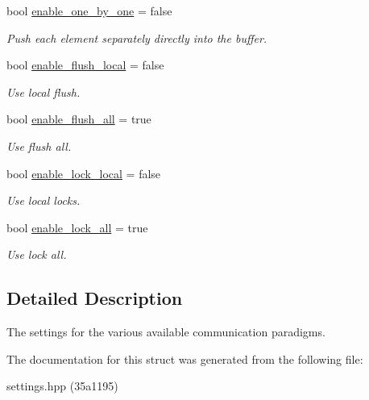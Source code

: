 \begin{DoxyCompactItemize}
bool \hyperlink{structSchwarzWrappers_1_1Settings_1_1comm__settings_a94a65410d1c436a47dbb116b5d3d5af1}{enable\+\_\+one\+\_\+by\+\_\+one} = false
\begin{DoxyCompactList}\small\item\em Push each element separately directly into the buffer. \end{DoxyCompactList}\item 
\mbox{\label{structSchwarzWrappers_1_1Settings_1_1comm__settings_a70c60458477096cecd87a53139ee61e8}} 
bool \hyperlink{structSchwarzWrappers_1_1Settings_1_1comm__settings_a70c60458477096cecd87a53139ee61e8}{enable\+\_\+flush\+\_\+local} = false
\begin{DoxyCompactList}\small\item\em Use local flush. \end{DoxyCompactList}\item 
\mbox{\label{structSchwarzWrappers_1_1Settings_1_1comm__settings_a147d1ec7e1eaa5bea9e640d0bb6a7636}} 
bool \hyperlink{structSchwarzWrappers_1_1Settings_1_1comm__settings_a147d1ec7e1eaa5bea9e640d0bb6a7636}{enable\+\_\+flush\+\_\+all} = true
\begin{DoxyCompactList}\small\item\em Use flush all. \end{DoxyCompactList}\item 
\mbox{\label{structSchwarzWrappers_1_1Settings_1_1comm__settings_aef1f78be36243e63b9ef7c04dee35f1b}} 
bool \hyperlink{structSchwarzWrappers_1_1Settings_1_1comm__settings_aef1f78be36243e63b9ef7c04dee35f1b}{enable\+\_\+lock\+\_\+local} = false
\begin{DoxyCompactList}\small\item\em Use local locks. \end{DoxyCompactList}\item 
\mbox{\label{structSchwarzWrappers_1_1Settings_1_1comm__settings_a9158358e7f737ae5769c5c51730dee7b}} 
bool \hyperlink{structSchwarzWrappers_1_1Settings_1_1comm__settings_a9158358e7f737ae5769c5c51730dee7b}{enable\+\_\+lock\+\_\+all} = true
\begin{DoxyCompactList}\small\item\em Use lock all. \end{DoxyCompactList}\end{DoxyCompactItemize}


\subsection{Detailed Description}
The settings for the various available communication paradigms. 

The documentation for this struct was generated from the following file\+:\begin{DoxyCompactItemize}
\item 
settings.\+hpp (35a1195)\end{DoxyCompactItemize}
